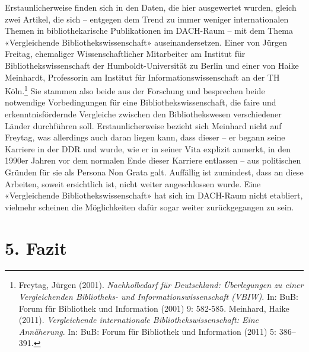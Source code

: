 \documentclass[a4paper,
fontsize=11pt,
oneside,
numbers=noperiodatend,
parskip=half-,
bibliography=totoc,
final
]{scrartcl}
\begin{document}
Erstaunlicherweise finden sich in den Daten, die hier ausgewertet
wurden, gleich zwei Artikel, die sich -- entgegen dem Trend zu immer
weniger internationalen Themen in bibliothekarische Publikationen im
DACH-Raum -- mit dem Thema «Vergleichende Bibliothekswissenschaft»
auseinandersetzen. Einer von Jürgen Freitag, ehemaliger
Wissenschaftlicher Mitarbeiter am Institut für Bibliothekswissenschaft
der Humboldt-Universität zu Berlin und einer von Haike Meinhardt,
Professorin am Institut für Informationswissenschaft an der TH
Köln.\footnote{Freytag, Jürgen (2001). \emph{Nachholbedarf für
  Deutschland: Überlegungen zu einer Vergleichenden Bibliotheks- und
  Informationswissenschaft (VBIW)}. In: BuB: Forum für Bibliothek und
  Information (2001) 9: 582-585. Meinhard, Haike (2011).
  \emph{Vergleichende internationale Bibliothekswissenschaft: Eine
  Annäherung}. In: BuB: Forum für Bibliothek und Information (2011) 5:
  386--391.} Sie stammen also beide aus der Forschung und besprechen
beide notwendige Vorbedingungen für eine Bibliothekswissenschaft, die
faire und erkenntnisfördernde Vergleiche zwischen den Bibliothekswesen
verschiedener Länder durchführen soll. Erstaunlicherweise bezieht sich
Meinhard nicht auf Freytag, was allerdings auch daran liegen kann, dass
dieser -- er begann seine Karriere in der DDR und wurde, wie er in
seiner Vita explizit anmerkt, in den 1990er Jahren vor dem normalen Ende
dieser Karriere entlassen -- aus politischen Gründen für sie als Persona
Non Grata galt. Auffällig ist zumindest, dass an diese Arbeiten, soweit
ersichtlich ist, nicht weiter angeschlossen wurde. Eine «Vergleichende
Bibliothekswissenschaft» hat sich im DACH-Raum nicht etabliert, vielmehr
scheinen die Möglichkeiten dafür sogar weiter zurückgegangen zu sein.

\hypertarget{fazit}{%
\section{5. Fazit}\label{fazit}}
\end{document}

